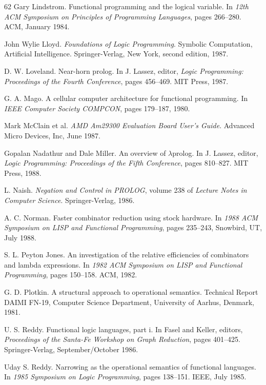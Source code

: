 \begin{thebibliography}{62}
Gary Lindstrom.
Functional programming and the logical variable.
In \emph{12th ACM Symposium on Principles of Programming Languages}, pages
266--280. ACM, January 1984.

John Wylie Lloyd.
\emph{Foundations of Logic Programming}.
Symbolic Computation, Artificial Intelligence. Springer-Verlag, New York,
second edition, 1987.

D. W. Loveland.
Near-horn prolog.
In J. Lassez, editor, \emph{Logic Programming: Proceedings of the Fourth
Conference}, pages 456--469. MIT Press, 1987.

G. A. Mago.
A cellular computer architecture for functional programming.
In \emph{IEEE Computer Society COMPCON}, pages 179--187, 1980.

Mark McClain et al.
\emph{AMD Am29300 Evaluation Board User's Guide}.
Advanced Micro Devices, Inc, June 1987.

Gopalan Nadathur and Dale Miller.
An overview of \(\lambda\)prolog.
In J. Lassez, editor, \emph{Logic Programming: Proceedings of the Fifth
Conference}, pages 810--827. MIT Press, 1988.

L. Naish.
\emph{Negation and Control in PROLOG}, volume 238 of \emph{Lecture Notes in Computer
Science}.
Springer-Verlag, 1986.

A. C. Norman.
Faster combinator reduction using stock hardware.
In \emph{1988 ACM Symposium on LISP and Functional Programming}, pages 235--243,
Snowbird, UT, July 1988.

S. L. Peyton Jones.
An investigation of the relative efficiencies of combinators and lambda
expressions.
In \emph{1982 ACM Symposium on LISP and Functional Programming}, pages 150--158.
ACM, 1982.

G. D. Plotkin.
A structural approach to operational semantics.
Technical Report DAIMI FN-19, Computer Science Department, University of
Aarhus, Denmark, 1981.

U. S. Reddy.
Functional logic languages, part i.
In Fasel and Keller, editors, \emph{Proceedings of the Santa-Fe Workshop on
Graph Reduction}, pages 401--425. Springer-Verlag, September/October 1986.

Uday S. Reddy.
Narrowing as the operational semantics of functional languages.
In \emph{1985 Symposium on Logic Programming}, pages 138--151. IEEE, July 1985.


\end{thebibliography}

